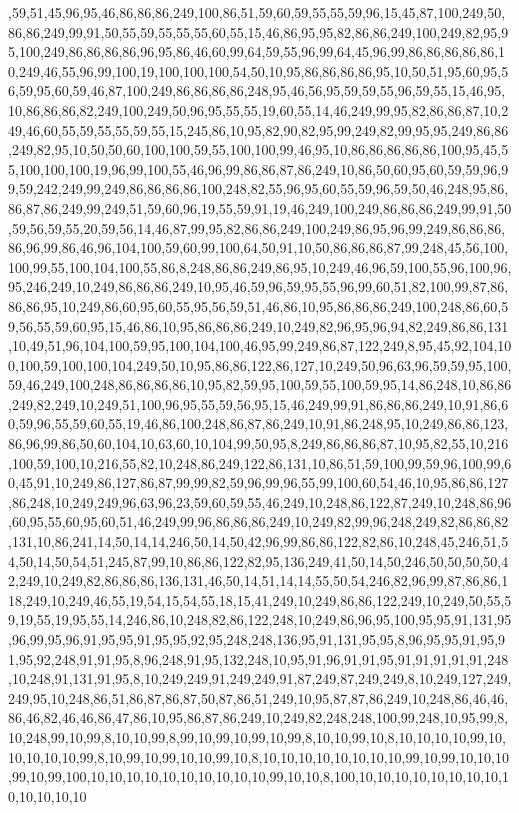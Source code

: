 ,59,51,45,96,95,46,86,86,86,249,100,86,51,59,60,59,55,55,59,96,15,45,87,100,249,50,86,86,249,99,91,50,55,59,55,55,55,60,55,15,46,86,95,95,82,86,86,249,100,249,82,95,95,100,249,86,86,86,86,96,95,86,46,60,99,64,59,55,96,99,64,45,96,99,86,86,86,86,86,10,249,46,55,96,99,100,19,100,100,100,54,50,10,95,86,86,86,86,95,10,50,51,95,60,95,56,59,95,60,59,46,87,100,249,86,86,86,86,248,95,46,56,95,59,59,55,96,59,55,15,46,95,10,86,86,86,82,249,100,249,50,96,95,55,55,19,60,55,14,46,249,99,95,82,86,86,87,10,249,46,60,55,59,55,55,59,55,15,245,86,10,95,82,90,82,95,99,249,82,99,95,95,249,86,86,249,82,95,10,50,50,60,100,100,59,55,100,100,99,46,95,10,86,86,86,86,86,100,95,45,55,100,100,100,19,96,99,100,55,46,96,99,86,86,87,86,249,10,86,50,60,95,60,59,59,96,99,59,242,249,99,249,86,86,86,86,100,248,82,55,96,95,60,55,59,96,59,50,46,248,95,86,86,87,86,249,99,249,51,59,60,96,19,55,59,91,19,46,249,100,249,86,86,86,249,99,91,50,59,56,59,55,20,59,56,14,46,87,99,95,82,86,86,249,100,249,86,95,96,99,249,86,86,86,86,96,99,86,46,96,104,100,59,60,99,100,64,50,91,10,50,86,86,86,87,99,248,45,56,100,100,99,55,100,104,100,55,86,8,248,86,86,249,86,95,10,249,46,96,59,100,55,96,100,96,95,246,249,10,249,86,86,86,249,10,95,46,59,96,59,95,55,96,99,60,51,82,100,99,87,86,86,86,95,10,249,86,60,95,60,55,95,56,59,51,46,86,10,95,86,86,86,249,100,248,86,60,59,56,55,59,60,95,15,46,86,10,95,86,86,86,249,10,249,82,96,95,96,94,82,249,86,86,131,10,49,51,96,104,100,59,95,100,104,100,46,95,99,249,86,87,122,249,8,95,45,92,104,100,100,59,100,100,104,249,50,10,95,86,86,122,86,127,10,249,50,96,63,96,59,59,95,100,59,46,249,100,248,86,86,86,86,10,95,82,59,95,100,59,55,100,59,95,14,86,248,10,86,86,249,82,249,10,249,51,100,96,95,55,59,56,95,15,46,249,99,91,86,86,86,249,10,91,86,60,59,96,55,59,60,55,19,46,86,100,248,86,87,86,249,10,91,86,248,95,10,249,86,86,123,86,96,99,86,50,60,104,10,63,60,10,104,99,50,95,8,249,86,86,86,87,10,95,82,55,10,216,100,59,100,10,216,55,82,10,248,86,249,122,86,131,10,86,51,59,100,99,59,96,100,99,60,45,91,10,249,86,127,86,87,99,99,82,59,96,99,96,55,99,100,60,54,46,10,95,86,86,127,86,248,10,249,249,96,63,96,23,59,60,59,55,46,249,10,248,86,122,87,249,10,248,86,96,60,95,55,60,95,60,51,46,249,99,96,86,86,86,249,10,249,82,99,96,248,249,82,86,86,82,131,10,86,241,14,50,14,14,246,50,14,50,42,96,99,86,86,122,82,86,10,248,45,246,51,54,50,14,50,54,51,245,87,99,10,86,86,122,82,95,136,249,41,50,14,50,246,50,50,50,50,42,249,10,249,82,86,86,86,136,131,46,50,14,51,14,14,55,50,54,246,82,96,99,87,86,86,118,249,10,249,46,55,19,54,15,54,55,18,15,41,249,10,249,86,86,122,249,10,249,50,55,59,19,55,19,95,55,14,246,86,10,248,82,86,122,248,10,249,86,96,95,100,95,95,91,131,95,96,99,95,96,91,95,95,91,95,95,92,95,248,248,136,95,91,131,95,95,8,96,95,95,91,95,91,95,92,248,91,91,95,8,96,248,91,95,132,248,10,95,91,96,91,91,95,91,91,91,91,91,248,10,248,91,131,91,95,8,10,249,249,91,249,249,91,87,249,87,249,249,8,10,249,127,249,249,95,10,248,86,51,86,87,86,87,50,87,86,51,249,10,95,87,87,86,249,10,248,86,46,46,86,46,82,46,46,86,47,86,10,95,86,87,86,249,10,249,82,248,248,100,99,248,10,95,99,8,10,248,99,10,99,8,10,10,99,8,99,10,99,10,99,10,99,8,10,10,99,10,8,10,10,10,10,99,10,10,10,10,10,99,8,10,99,10,99,10,10,99,10,8,10,10,10,10,10,10,10,10,99,10,99,10,10,10,99,10,99,100,10,10,10,10,10,10,10,10,10,10,99,10,10,8,100,10,10,10,10,10,10,10,10,10,10,10,10,10